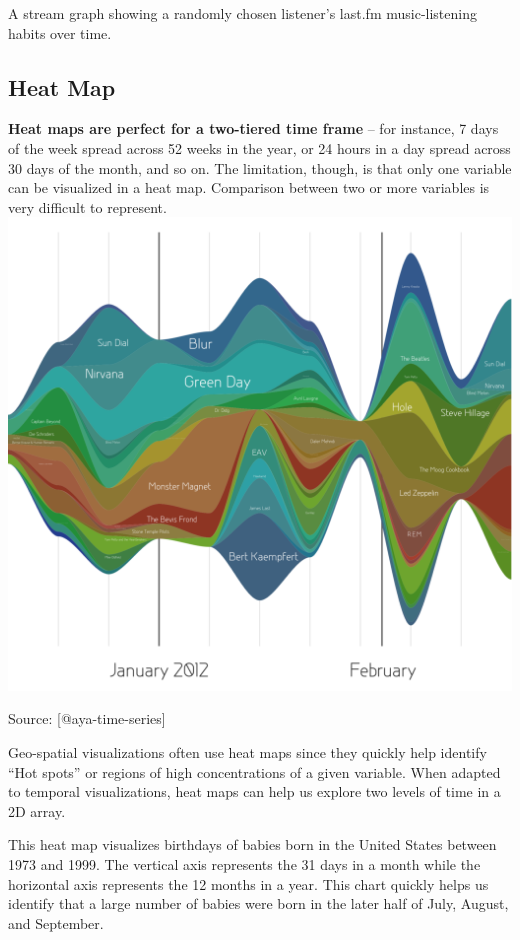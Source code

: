 \documentclass[]{book}
\theoremstyle{definition}
\theoremstyle{definition}
\theoremstyle{definition}
\theoremstyle{remark}
\begin{document}
A stream graph showing a randomly chosen listener's last.fm
music-listening habits over time.

\subsection{Heat Map}\label{heat-map}

\textbf{Heat maps are perfect for a two-tiered time frame} -- for
instance, 7 days of the week spread across 52 weeks in the year, or 24
hours in a day spread across 30 days of the month, and so on. The
limitation, though, is that only one variable can be visualized in a
heat map. Comparison between two or more variables is very difficult to
represent. \includegraphics{images/aya-stream.png}

Source: {[}@aya-time-series{]}

Geo-spatial visualizations often use heat maps since they quickly help
identify ``Hot spots'' or regions of high concentrations of a given
variable. When adapted to temporal visualizations, heat maps can help us
explore two levels of time in a 2D array.

This heat map visualizes birthdays of babies born in the United States
between 1973 and 1999. The vertical axis represents the 31 days in a
month while the horizontal axis represents the 12 months in a year. This
chart quickly helps us identify that a large number of babies were born
in the later half of July, August, and September.
\end{document}
